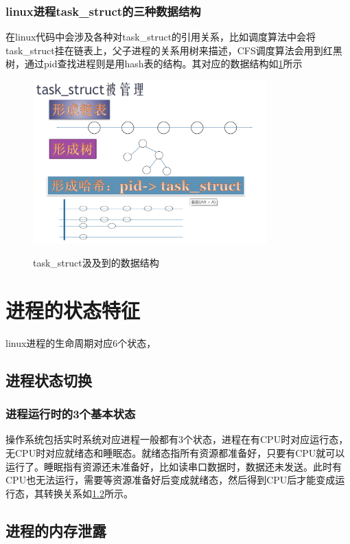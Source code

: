 \subsection{linux进程task\_struct的三种数据结构}
在linux代码中会涉及各种对task\_struct的引用关系，比如调度算法中会将task\_struct挂在链表上，父子进程的关系用树来描述，CFS调度算法会用到红黑树，通过pid查找进程则是用hash表的结构。其对应的数据结构如\ref{task_datastructure}所示

\begin{figure}[H]
 \wdfigbox
  {\caption{task\_struct汲及到的数据结构}\label{task_datastructure}}
  {
  \includegraphics[width=9cm]{./figure/task_datastructure.png}
  }
\end{figure}
\chapter{进程的状态特征}
linux进程的生命周期对应6个状态，
\section{进程状态切换}
\subsection{进程运行时的3个基本状态}
操作系统包括实时系统对应进程一般都有3个状态，进程在有CPU时对应运行态，无CPU时对应就绪态和睡眠态。就绪态指所有资源都准备好，只要有CPU就可以运行了。睡眠指有资源还未准备好，比如读串口数据时，数据还未发送。此时有CPU也无法运行，需要等资源准备好后变成就绪态，然后得到CPU后才能变成运行态，其转换关系如\ref{}所示。

\section{进程的内存泄露}

